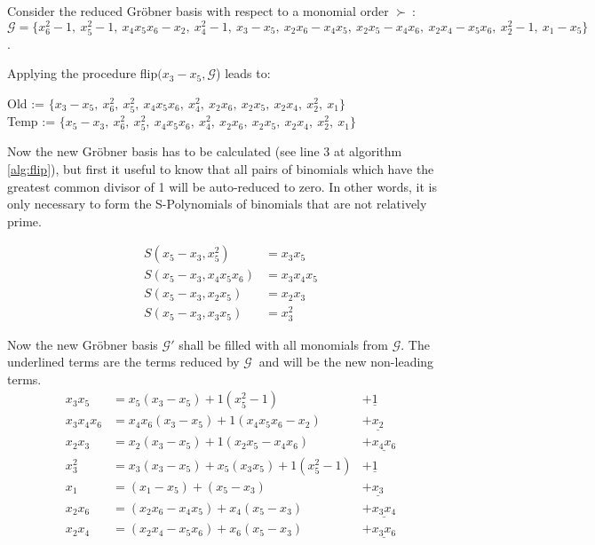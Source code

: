 \begin{env_example}\normalfont
Consider the reduced Gröbner basis with respect to a monomial order $\succ~$: $\mathcal{G}= \{x_{6}^{2}-1,~x_{5}^{2}-1,~x_{4}x_{5}x_{6} -x_{2},~x_{4}^{2}-1,~x_{3}-x_{5},~x_{2}x_{6}-x_{4}x_{5},~x_{2}x_{5}-x_{4}x_{6},~x_{2}x_{4}-x_{5}x_{6},~x_{2}^{2}-1,~x_{1}-x_{5}  \} $.

Applying the procedure flip$(x_{3}-x_{5}, \mathcal{G}$) leads to:

Old := $\{x_{3}-x_{5},~x_{6}^{2},~x_{5}^{2},~x_{4}x_{5}x_{6} ,~x_{4}^{2},~x_{2}x_{6},~x_{2}x_{5},~x_{2}x_{4},~x_{2}^{2},~x_{1} \} $ \\
Temp := $\{x_{5}-x_{3},~x_{6}^{2},~x_{5}^{2},~x_{4}x_{5}x_{6} ,~x_{4}^{2},~x_{2}x_{6},~x_{2}x_{5},~x_{2}x_{4},~x_{2}^{2},~x_{1} \} $

Now the new Gröbner basis has to be calculated (see line 3 at algorithm \ref{alg:flip}), but first it useful to know that all pairs of binomials which have the greatest common divisor of 1 will be auto-reduced to zero. In other words, it is only necessary to form the S-Polynomials of binomials that are not relatively prime.

\begin{align*}
	S(x_{5}-x_{3},x_{5}^{2}) &= x_{3}x_{5} \\
	S(x_{5}-x_{3},x_{4}x_{5}x_{6}) &= x_{3}x_{4}x_{5} \\
	S(x_{5}-x_{3},x_{2}x_{5}) &= x_{2}x_{3} \\
	S(x_{5}-x_{3},x_{3}x_{5}) &= x_{3}^{2}
\end{align*}

Now the new Gröbner basis $\mathcal{G}'$ shall be filled with all monomials from $\mathcal{G}$.
The underlined terms are the terms reduced by $\mathcal{G}~$ and will be the new non-leading terms.
\begin{align*}
	x_{3}x_{5} &= x_{5}(x_{3}-x_{5}) + 1(x_{5}^{2}-1) &+ \underline{1} \\
	x_{3}x_{4}x_{6} &= x_{4}x_{6}(x_{3}-x_{5}) + 1(x_{4}x_{5}x_{6}-x_{2}) &+ \underline{x_{2}} \\
	x_{2}x_{3} &= x_{2}(x_{3}-x_{5}) + 1(x_{2}x_{5}- x_{4}x_{6}) &+ \underline{x_{4}x_{6}} \\
	x_{3}^{2} &= x_{3}(x_{3}-x_{5}) + x_{5}(x_{3}x_{5}) + 1(x_{5}^{2}-1)&+\underline{1} \\
	x_{1} &= (x_{1}-x_{5}) + (x_{5}-x_{3}) &+\underline{ x_{3}} \\
	x_{2}x_{6} &= (x_{2}x_{6}-x_{4}x_{5}) + x_{4}(x_{5}-x_{3}) &+\underline{ x_{3}x_{4}} \\
	x_{2}x_{4} &= (x_{2}x_{4}-x_{5}x_{6})+ x_{6}(x_{5}-x_{3}) &+\underline{x_{3}x_{6}}
\end{align*}


\end{env_example}
